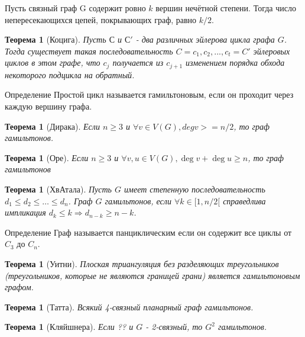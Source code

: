 \documentclass[a4paper,openany]{book}
\newcounter{TheoremCounter}
\newtheorem{theorem}[TheoremCounter]{Теорема}
\newenvironment{definition}
{\begin{statement}{Определение}}
    {\end{statement}}
\newenvironment{consequence}{}{}
\begin{document}
\begin{consequence}
  Пусть связный граф G содержит ровно $k$ вершин нечётной степени. Тогда число
  непересекающихся цепей, покрывающих граф, равно $k/2$.
\end{consequence}

\begin{theorem}[Коцига]
  Пусть $С$ и $С'$ - два различных эйлерова цикла графа $G$. Тогда существует
  такая последовательность $C=c_1,c_2,...,c_t=C'$ эйлеровых циклов в этом графе,
  что $c_j$ получается из $c_{j+1}$ изменением порядка обхода некоторого
  подцикла на обратный.
\end{theorem}

\begin{definition}
  Простой цикл называется гамильтоновым, если он проходит через каждую вершину
  графа.
\end{definition}

\begin{theorem}[Дирака]
  Если $n \geqslant 3$ и $\forall v \in V(G), deg v >= n/2$, то граф гамильтонов.
\end{theorem}

\begin{theorem}[Оре]
  Если $n \geqslant 3$ и $\forall v, u \in V(G), \deg v + \deg u \geqslant n$,
  то граф гамильтонов
\end{theorem}

\begin{theorem}[ХвАтала]
  Пусть $G$ имеет степенную последовательность $d_1 \leqslant d_2 \leqslant
  \ldots \leqslant d_n$. Граф $G$ гамильтонов, если $\forall k \in [1,n/2[$
  справедлива импликация $d_k \leqslant k \Rightarrow d_{n-k} \geqslant n-k$.
\end{theorem}

\begin{definition}
  Граф называется панциклическим если он содержит все циклы от $C_3$ до $C_n$.
\end{definition}

\begin{theorem}[Уитни]
  Плоская триангуляция без разделяющих треугольников (треугольников, которые не
  являются границей грани) является гамильтоновым графом.
\end{theorem}

\begin{theorem}[Татта]
  Всякий 4-связный планарный граф гамильтонов.
\end{theorem}

\begin{theorem}[Кляйшнера]
  Если ?? и $G$ - 2-связный, то $G^2$ гамильтонов.
\end{theorem}
\end{document}
